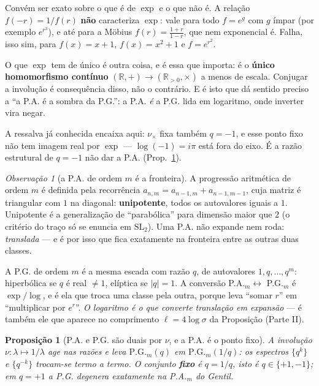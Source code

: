 \documentclass[11pt,a4paper]{article}
\theoremstyle{plain}
\newtheorem{proposicao}[teorema]{Proposição}
\theoremstyle{definition}
\theoremstyle{remark}
\newtheorem{obs}[teorema]{Observação}
\newcommand{\R}{\mathbb{R}}
\newcommand{\SL}{\mathrm{SL}}
\begin{document}
\noindent Convém ser exato sobre o que é de $\exp$ e o que não é. A relação $f(-r) = 1/f(r)$
\textbf{não} caracteriza $\exp$: vale para todo $f = e^{g}$ com $g$ ímpar (por exemplo
$e^{r^3}$), e até para a Möbius $f(r) = \frac{1+r}{1-r}$, que nem exponencial é. Falha, isso sim,
para $f(x)=x+1$, $f(x)=x^2+1$ e $f = e^{r^2}$.

O que $\exp$ tem de único é outra coisa, e é essa que importa: é o \textbf{único homomorfismo
contínuo} $(\R,+) \to (\R_{>0},\times)$ a menos de escala. Conjugar a involução é consequência
disso, não o contrário. E é isto que dá sentido preciso a ``a P.A. é a sombra da P.G.'': a P.A.
\emph{é} a P.G. lida em logaritmo, onde inverter vira negar.

A ressalva já conhecida encaixa aqui: $\nu_\times$ fixa também $q=-1$, e esse ponto fixo não tem
imagem real por $\exp$ --- $\log(-1) = i\pi$ está fora do eixo. É a razão estrutural de $q=-1$ não
dar a P.A. (Prop.~\ref{prop:papg}).



\begin{obs}[a P.A. de ordem $m$ é a fronteira]\label{obs:pam}
A progressão aritmética de ordem $m$ é definida pela recorrência $a_{n,m} = a_{n-1,m} +
a_{n-1,m-1}$, cuja matriz é triangular com $1$ na diagonal: \textbf{unipotente}, todos os
autovalores iguais a $1$. Unipotente é a generalização de ``parabólica'' para dimensão maior que
$2$ (o critério do traço só se enuncia em $\SL_2$). Uma P.A. não expande nem roda: \emph{translada}
--- e é por isso que fica exatamente na fronteira entre as outras duas classes.

A P.G. de ordem $m$ é a mesma escada com razão $q$, de autovalores $1,q,\dots,q^m$: hiperbólica se
$q$ é real $\neq1$, elíptica se $|q|=1$. A conversão P.A.$_m \leftrightarrow$ P.G.$_m$ é
$\exp/\log$, e é ela que troca uma classe pela outra, porque leva ``somar $r$'' em ``multiplicar
por $e^r$''. \emph{O logaritmo é o que converte translação em expansão} --- é também ele que
aparece no comprimento $\ell = 4\log\sigma$ da Proposição (Parte II).
\end{obs}

\begin{proposicao}[P.A. e P.G. são duais por $\nu$, e a P.A. é o ponto fixo]\label{prop:papg}
A involução $\nu\colon \lambda\mapsto1/\lambda$ age nas razões e leva
$\mathrm{P.G.}_m(q)$ em $\mathrm{P.G.}_m(1/q)$: os espectros $\{q^k\}$ e $\{q^{-k}\}$ trocam-se
termo a termo. O conjunto \textbf{fixo} é $q = 1/q$, isto é $q\in\{+1,-1\}$; em $q=+1$ a P.G.
degenera exatamente na P.A.$_m$ do Gentil.
\end{proposicao}
\end{document}
